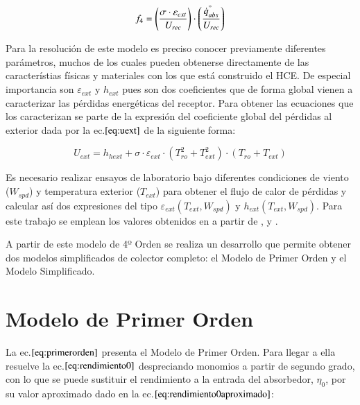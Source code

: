 \begin{equation}
    f_{4} = \left(\frac{\sigma \cdot \varepsilon_{ext}}{U_{rec}} \right) \cdot \left(\frac{\dot{q}^{"}_{abs}}{U_{rec}}\right) 
    \label{eq:f4}
\end{equation}

Para la resolución de este modelo es preciso conocer previamente diferentes parámetros, muchos de los cuales pueden obtenerse directamente de las característias físicas y materiales con los que está construido el HCE. De especial importancia son \(\varepsilon_{ext}\) y \(h_{ext}\) pues son dos coeficientes que de forma global vienen a caracterizar las pérdidas energéticas del receptor. Para obtener las ecuaciones que los caracterizan se parte de la expresión del coeficiente global del pérdidas al exterior dada por la ec.\(\eqref{eq:uext}\) de la siguiente forma:

\begin{equation}
    U_{ext} = h_{hext} + \sigma \cdot \varepsilon_{ext} \cdot \left(T_{ro}^2 + T_{ext}^2 \right) \cdot \left(T_{ro} + T_{ext} \right)
    \label{eq:uext}
\end{equation}

Es necesario realizar ensayos de laboratorio bajo diferentes condiciones de viento (\(W_{spd}\)) y temperatura exterior (\(T_{ext}\)) para obtener el flujo de calor de pérdidas y calcular así dos expresiones del tipo \(\varepsilon_{ext}(T_{ext},W_{spd})\) y \(h_{ext}(T_{ext},W_{spd})\). Para este trabajo se emplean los valores obtenidos en \cite{barberofresnoDesarrolloModeloTeorico2018} a partir de \cite{burkholderHeatLossTestingSolel2008}, \cite{burkholderHeatLossTesting2009} y \cite{kutscherGenerationParabolicTrough2012}.

A partir de este modelo de 4º Orden se realiza un desarrollo que permite obtener dos modelos simplificados de colector completo: el Modelo de Primer Orden y el Modelo Simplificado.

\section{Modelo de Primer Orden}

La ec.\(\eqref{eq:primerorden}\) presenta el Modelo de Primer Orden. Para llegar a ella resuelve la ec.\(\eqref{eq:rendimiento0}\) despreciando monomios a partir de segundo grado, con lo que se puede sustituir el rendimiento a la entrada del absorbedor, \(\eta_{0}\), por su valor aproximado dado en la ec.\(\eqref{eq:rendimiento0aproximado}\):

